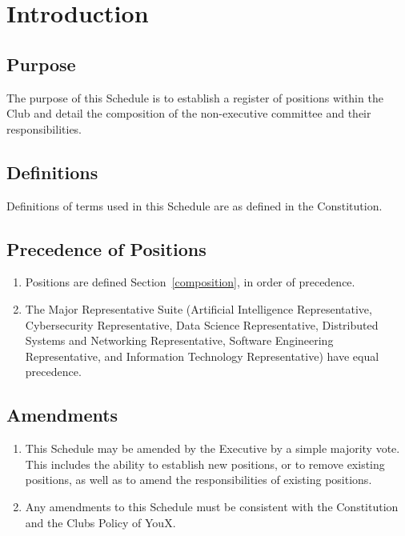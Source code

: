 \documentclass{schedule}
\begin{document}


\tableofcontents
\newpage


\section{Introduction}

\subsection{Purpose}
The purpose of this Schedule is to establish a register of positions within the Club and detail the composition of the non-executive committee and their responsibilities.

\subsection{Definitions}
Definitions of terms used in this Schedule are as defined in the Constitution.

\subsection{Precedence of Positions}
\begin{enumerate}[(1)]
    \item Positions are defined Section~\ref{composition}, in order of precedence.
    \item The Major Representative Suite (Artificial Intelligence Representative, Cybersecurity Representative, Data Science Representative, Distributed Systems and Networking Representative, Software Engineering Representative, and Information Technology Representative) have equal precedence.
\end{enumerate}

\subsection{Amendments}
\begin{enumerate}[(1)]
    \item This Schedule may be amended by the Executive by a simple majority vote. This includes the ability to establish new positions, or to remove existing positions, as well as to amend the responsibilities of existing positions.
    \item Any amendments to this Schedule must be consistent with the Constitution and the Clubs Policy of YouX.
\end{enumerate}
\end{document}
